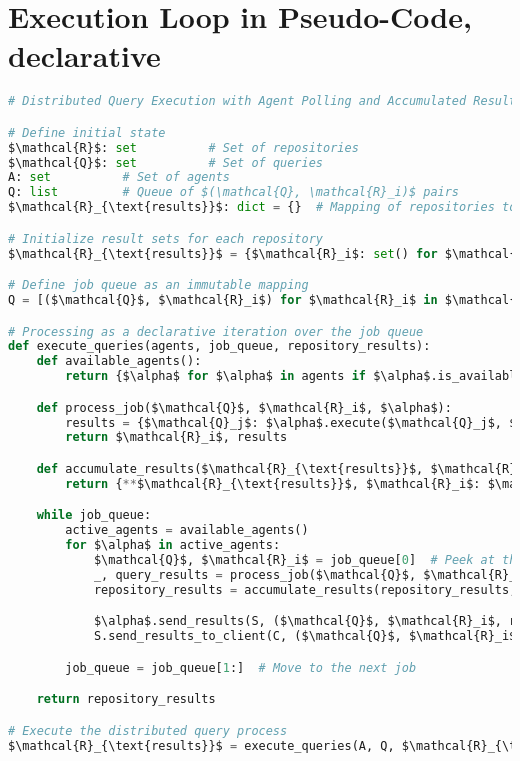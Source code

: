 \documentclass[11pt]{article}
\begin{document}
\section{Execution Loop in Pseudo-Code, declarative}
\begin{listing}[h] %
  \caption{Distributed Query Execution Algorithm}

\begin{lstlisting}[language=Python]
# Distributed Query Execution with Agent Polling and Accumulated Results

# Define initial state
$\mathcal{R}$: set          # Set of repositories
$\mathcal{Q}$: set          # Set of queries
A: set          # Set of agents
Q: list         # Queue of $(\mathcal{Q}, \mathcal{R}_i)$ pairs
$\mathcal{R}_{\text{results}}$: dict = {}  # Mapping of repositories to their accumulated query results

# Initialize result sets for each repository
$\mathcal{R}_{\text{results}}$ = {$\mathcal{R}_i$: set() for $\mathcal{R}_i$ in $\mathcal{R}$}

# Define job queue as an immutable mapping
Q = [($\mathcal{Q}$, $\mathcal{R}_i$) for $\mathcal{R}_i$ in $\mathcal{R}$]

# Processing as a declarative iteration over the job queue
def execute_queries(agents, job_queue, repository_results):
    def available_agents():
        return {$\alpha$ for $\alpha$ in agents if $\alpha$.is_available()}

    def process_job($\mathcal{Q}$, $\mathcal{R}_i$, $\alpha$):
        results = {$\mathcal{Q}_j$: $\alpha$.execute($\mathcal{Q}_j$, $\mathcal{R}_i$) for $\mathcal{Q}_j$ in $\mathcal{Q}$}
        return $\mathcal{R}_i$, results

    def accumulate_results($\mathcal{R}_{\text{results}}$, $\mathcal{R}_i$, query_results):
        return {**$\mathcal{R}_{\text{results}}$, $\mathcal{R}_i$: $\mathcal{R}_{\text{results}}$[$\mathcal{R}_i$] | set().union(*query_results.values())}

    while job_queue:
        active_agents = available_agents()
        for $\alpha$ in active_agents:
            $\mathcal{Q}$, $\mathcal{R}_i$ = job_queue[0]  # Peek at the first job
            _, query_results = process_job($\mathcal{Q}$, $\mathcal{R}_i$, $\alpha$)
            repository_results = accumulate_results(repository_results, $\mathcal{R}_i$, query_results)

            $\alpha$.send_results(S, ($\mathcal{Q}$, $\mathcal{R}_i$, repository_results[$\mathcal{R}_i$]))
            S.send_results_to_client(C, ($\mathcal{Q}$, $\mathcal{R}_i$, repository_results[$\mathcal{R}_i$]))

        job_queue = job_queue[1:]  # Move to the next job

    return repository_results

# Execute the distributed query process
$\mathcal{R}_{\text{results}}$ = execute_queries(A, Q, $\mathcal{R}_{\text{results}}$)
\end{lstlisting}



\end{listing}
\FloatBarrier
\end{document}
